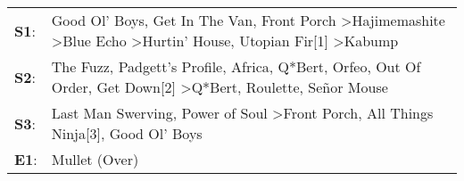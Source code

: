 \begin{supertabular}{p{0.03\textwidth}p{0.92\textwidth}}
 \textbf{S1}:  &                     Good Ol' Boys\textsuperscript{}, \enspace Get In The Van\textsuperscript{}, \enspace Front Porch\textsuperscript{} \textgreater \enspace Hajimemashite\textsuperscript{} \textgreater \enspace Blue Echo\textsuperscript{} \textgreater \enspace Hurtin' House\textsuperscript{}, \enspace Utopian Fir[1]\textsuperscript{} \textgreater \enspace Kabump\textsuperscript{}  \enspace  \\
 \textbf{S2}:  &  The Fuzz\textsuperscript{}, \enspace Padgett's Profile\textsuperscript{}, \enspace Africa\textsuperscript{}, \enspace Q*Bert\textsuperscript{}, \enspace Orfeo\textsuperscript{}, \enspace Out Of Order\textsuperscript{}, \enspace Get Down[2]\textsuperscript{} \textgreater \enspace Q*Bert\textsuperscript{}, \enspace Roulette\textsuperscript{}, \enspace Señor Mouse\textsuperscript{}  \enspace  \\
 \textbf{S3}:  &                                                                                                                                                                    Last Man Swerving\textsuperscript{}, \enspace Power of Soul\textsuperscript{} \textgreater \enspace Front Porch\textsuperscript{}, \enspace All Things Ninja[3]\textsuperscript{}, \enspace Good Ol' Boys\textsuperscript{}  \enspace  \\
 \textbf{E1}:  &                                                                                                                                                                                                                                                                                                                                                                Mullet (Over)\textsuperscript{}  \enspace  \\
\end{supertabular}
